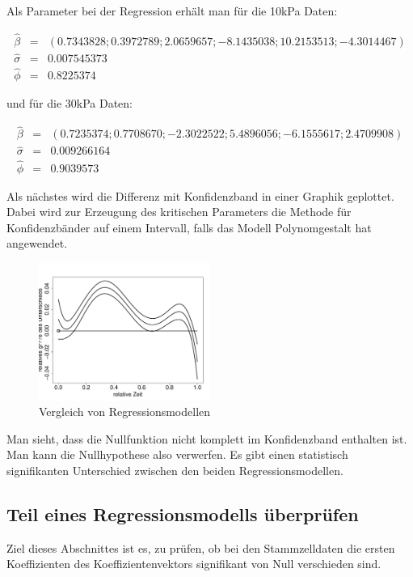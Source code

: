 \documentclass[12pt,a4paper]{article}
\theoremstyle{definition}
\theoremstyle{definition}
\theoremstyle{definition}
\theoremstyle{definition}
\begin{document}
Als Parameter bei der Regression erhält man für die 10kPa Daten:

\begin{eqnarray*}
\hat{\beta} &=& (0.7343828 ;  0.3972789 ; 2.0659657 ; -8.1435038 ; 10.2153513 ; -4.3014467)  \\
\hat{\sigma} &=& 0.007545373 \\
\hat{\phi} &=& 0.8225374
\end{eqnarray*}

und für die 30kPa Daten:

\begin{eqnarray*}
\hat{\beta} &=& (0.7235374 ; 0.7708670 ; -2.3022522 ; 5.4896056 ; -6.1555617 ; 2.4709908) \\
\hat{\sigma} &=& 0.009266164 \\
\hat{\phi} &=& 0.9039573
\end{eqnarray*}

Als nächstes wird die Differenz mit Konfidenzband in einer Graphik geplottet. Dabei wird zur Erzeugung des kritischen Parameters die Methode für Konfidenzbänder auf einem Intervall, falls das Modell Polynomgestalt hat angewendet.

\begin{figure}[H] 
  \centering
     \includegraphics[width=0.5\textwidth]{Vergleich-10vs30kPa-poly5-KB}
  \caption{Vergleich von Regressionsmodellen}
  \label{fig:10}
\end{figure}

Man sieht, dass die Nullfunktion nicht komplett im Konfidenzband enthalten ist. Man kann die Nullhypothese also verwerfen. Es gibt einen statistisch signifikanten Unterschied zwischen den beiden Regressionsmodellen.


\subsection{Teil eines Regressionsmodells überprüfen}
Ziel dieses Abschnittes ist es, zu prüfen, ob bei den Stammzelldaten die ersten Koeffizienten des Koeffizientenvektors signifikant von Null verschieden sind.
\end{document}
